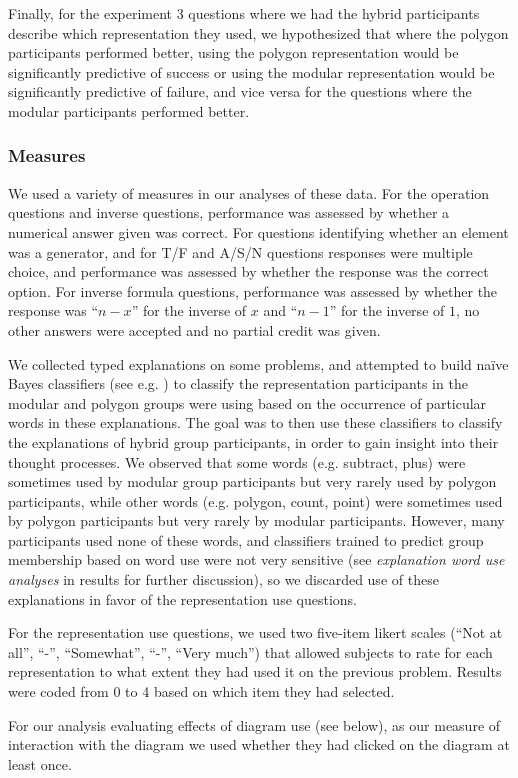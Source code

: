 \documentclass[man,10pt]{apa6}
\begin{document}
Finally, for the experiment 3 questions where we had the hybrid participants describe which representation they used, we hypothesized that where the polygon participants performed better, using the polygon representation would be significantly predictive of success or using the modular representation would be significantly predictive of failure, and vice versa for the questions where the modular participants performed better.
\subsubsection{Measures}
We used a variety of measures in our analyses of these data. For the operation questions and inverse questions, performance was assessed by whether a numerical answer given was correct. For questions identifying whether an element was a generator, and for T/F and A/S/N questions responses were multiple choice, and performance was assessed by whether the response was the correct option. For inverse formula questions, performance was assessed by whether the response was ``$n-x$'' for the inverse of $x$ and ``$n-1$'' for the inverse of $1$, no other answers were accepted and no partial credit was given.\par
We collected typed explanations on some problems, and attempted to build na{\"i}ve Bayes classifiers (see e.g. \cite{Ng2002}) to classify the representation participants in the modular and polygon groups were using based on the occurrence of particular words in these explanations. The goal was to then use these classifiers to classify the explanations of hybrid group participants, in order to gain insight into their thought processes. We observed that some words (e.g. subtract, plus) were sometimes used by modular group participants but very rarely used by polygon participants, while other words (e.g. polygon, count, point) were sometimes used by polygon participants but very rarely by modular participants. However, many participants used none of these words, and classifiers trained to predict group membership based on word use were not very sensitive (see \emph{explanation word use analyses} in results for further discussion), so we discarded use of these explanations in favor of the representation use questions. \par
For the representation use questions, we used two five-item likert scales (``Not at all'', ``-'', ``Somewhat'', ``-'', ``Very much'') that allowed subjects to rate for each representation to what extent they had used it on the previous problem. Results were coded from 0 to 4 based on which item they had selected. \par
For our analysis evaluating effects of diagram use (see below), as our measure of interaction with the diagram we used whether they had clicked on the diagram at least once. 
\end{document}
